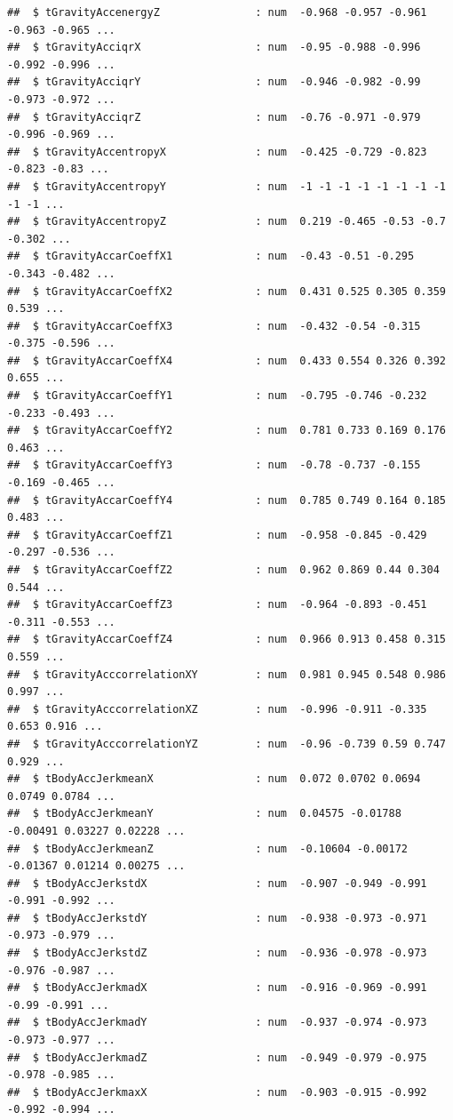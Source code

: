 \documentclass[
]{article}
\begin{document}
\begin{verbatim}
##  $ tGravityAccenergyZ               : num  -0.968 -0.957 -0.961 -0.963 -0.965 ...
##  $ tGravityAcciqrX                  : num  -0.95 -0.988 -0.996 -0.992 -0.996 ...
##  $ tGravityAcciqrY                  : num  -0.946 -0.982 -0.99 -0.973 -0.972 ...
##  $ tGravityAcciqrZ                  : num  -0.76 -0.971 -0.979 -0.996 -0.969 ...
##  $ tGravityAccentropyX              : num  -0.425 -0.729 -0.823 -0.823 -0.83 ...
##  $ tGravityAccentropyY              : num  -1 -1 -1 -1 -1 -1 -1 -1 -1 -1 ...
##  $ tGravityAccentropyZ              : num  0.219 -0.465 -0.53 -0.7 -0.302 ...
##  $ tGravityAccarCoeffX1             : num  -0.43 -0.51 -0.295 -0.343 -0.482 ...
##  $ tGravityAccarCoeffX2             : num  0.431 0.525 0.305 0.359 0.539 ...
##  $ tGravityAccarCoeffX3             : num  -0.432 -0.54 -0.315 -0.375 -0.596 ...
##  $ tGravityAccarCoeffX4             : num  0.433 0.554 0.326 0.392 0.655 ...
##  $ tGravityAccarCoeffY1             : num  -0.795 -0.746 -0.232 -0.233 -0.493 ...
##  $ tGravityAccarCoeffY2             : num  0.781 0.733 0.169 0.176 0.463 ...
##  $ tGravityAccarCoeffY3             : num  -0.78 -0.737 -0.155 -0.169 -0.465 ...
##  $ tGravityAccarCoeffY4             : num  0.785 0.749 0.164 0.185 0.483 ...
##  $ tGravityAccarCoeffZ1             : num  -0.958 -0.845 -0.429 -0.297 -0.536 ...
##  $ tGravityAccarCoeffZ2             : num  0.962 0.869 0.44 0.304 0.544 ...
##  $ tGravityAccarCoeffZ3             : num  -0.964 -0.893 -0.451 -0.311 -0.553 ...
##  $ tGravityAccarCoeffZ4             : num  0.966 0.913 0.458 0.315 0.559 ...
##  $ tGravityAcccorrelationXY         : num  0.981 0.945 0.548 0.986 0.997 ...
##  $ tGravityAcccorrelationXZ         : num  -0.996 -0.911 -0.335 0.653 0.916 ...
##  $ tGravityAcccorrelationYZ         : num  -0.96 -0.739 0.59 0.747 0.929 ...
##  $ tBodyAccJerkmeanX                : num  0.072 0.0702 0.0694 0.0749 0.0784 ...
##  $ tBodyAccJerkmeanY                : num  0.04575 -0.01788 -0.00491 0.03227 0.02228 ...
##  $ tBodyAccJerkmeanZ                : num  -0.10604 -0.00172 -0.01367 0.01214 0.00275 ...
##  $ tBodyAccJerkstdX                 : num  -0.907 -0.949 -0.991 -0.991 -0.992 ...
##  $ tBodyAccJerkstdY                 : num  -0.938 -0.973 -0.971 -0.973 -0.979 ...
##  $ tBodyAccJerkstdZ                 : num  -0.936 -0.978 -0.973 -0.976 -0.987 ...
##  $ tBodyAccJerkmadX                 : num  -0.916 -0.969 -0.991 -0.99 -0.991 ...
##  $ tBodyAccJerkmadY                 : num  -0.937 -0.974 -0.973 -0.973 -0.977 ...
##  $ tBodyAccJerkmadZ                 : num  -0.949 -0.979 -0.975 -0.978 -0.985 ...
##  $ tBodyAccJerkmaxX                 : num  -0.903 -0.915 -0.992 -0.992 -0.994 ...

\end{verbatim}
\end{document}
